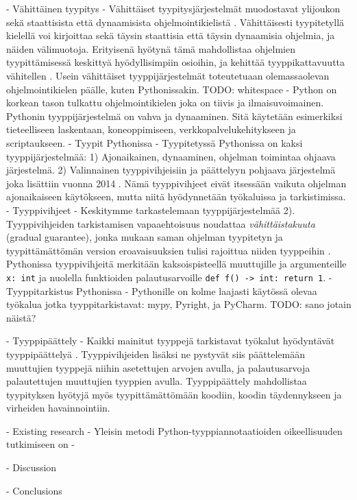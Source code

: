 \begin{otherlanguage}{finnish}
    - Vähittäinen tyypitys
        - Vähittäiset tyypitysjärjestelmät muodostavat ylijoukon sekä staattisista että dynaamisista ohjelmointikielistä \cite{siek_refined_gradual_2015}. Vähittäisesti tyypitetyllä kielellä voi kirjoittaa sekä täysin staattisia että täysin dynaamisia ohjelmia, ja näiden välimuotoja. Erityisenä hyötynä tämä mahdollistaa ohjelmien tyypittämisessä keskittyä hyödyllisimpiin osioihin, ja kehittää tyyppikattavuutta vähitellen \cite{siek_refined_gradual_2015}. Usein vähittäiset tyyppijärjestelmät toteutetuaan olemassaolevan ohjelmointikielen päälle, kuten Pythonissakin.
        TODO: whitespace
    - Python on korkean tason tulkattu ohjelmointikielen joka on tiivis ja ilmaisuvoimainen. Pythonin tyyppijärjestelmä on vahva ja dynaaminen. Sitä käytetään esimerkiksi tieteelliseen laskentaan, koneoppimiseen, verkkopalvelukehitykseen ja scriptaukseen.
    - Tyypit Pythonissa
        - Tyypitetyssä Pythonissa on kaksi tyyppijärjestelmää: 1) Ajonaikainen, dynaaminen, ohjelman toimintaa ohjaava järjestelmä. 2) Valinnainen tyyppivihjeisiin ja päättelyyn pohjaava järjestelmä joka lisättiin vuonna 2014 \cite{pep_484}. Nämä tyyppivihjeet eivät itsessään vaikuta ohjelman ajonaikaiseen käytökseen, mutta niitä hyödynnetään työkaluissa ja tarkistimissa.
    - Tyyppivihjeet
        - Keskitymme tarkastelemaan tyyppijärjestelmää 2). Tyyppivihjeiden tarkistamisen vapaaehtoisuus noudattaa \emph{vähittäistakuuta} (gradual guarantee), jonka mukaan saman ohjelman tyypitetyn ja tyypittämättömän version eroavaisuuksien tulisi rajoittua niiden tyyppeihin \cite{siek_refined_gradual_2015}. Pythonissa tyyppivihjeitä merkitään kaksoispisteellä muuttujille ja argumenteille {\tt x: int} ja nuolella funktioiden palautusarvoille {\tt def f() -> int: return 1}.
    - Tyyppitarkistus Pythonissa
        - Pythonille on kolme laajasti käytössä olevaa työkalua jotka tyyppitarkistavat: mypy, Pyright, ja PyCharm.
        TODO: sano jotain näistä?

    - Tyyppipäättely
        - Kaikki mainitut tyyppejä tarkistavat työkalut hyödyntävät tyyppipäättelyä \cite{jetbrains_type_hinting_pycharm, mypy_type_inference, pyright_type_inference}. Tyyppivihjeiden lisäksi ne pystyvät siis päättelemään muuttujien tyyppejä niihin asetettujen arvojen avulla, ja palautusarvoja palautettujen muuttujien tyyppien avulla. Tyyppipäättely mahdollistaa tyypityksen hyötyjä myös tyypittämättömään koodiin, koodin täydennykseen ja virheiden havainnointiin.

- Existing research
    - Yleisin metodi Python-tyyppiannotaatioiden oikeellisuuden tutkimiseen on
    -

- Discussion

- Conclusions

\end{otherlanguage}

